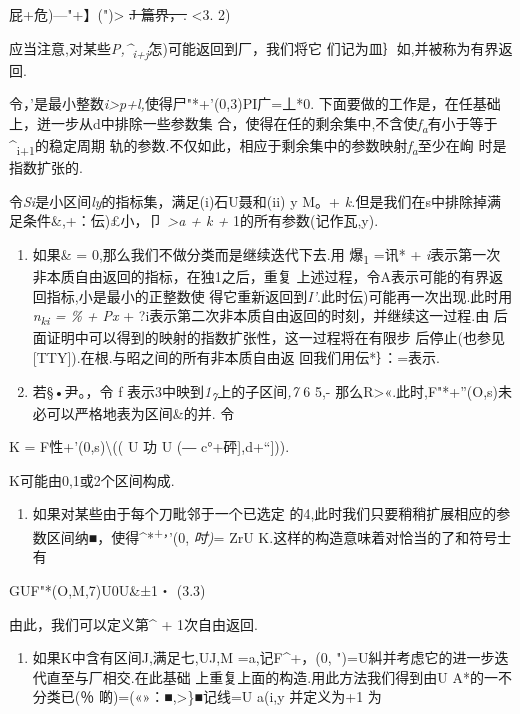 屁+危)---"+】(")\textbar{}\textgreater{} \sout{J 篇界，.} \textless{}3.
2)

应当注意,对某些\emph{P,\^{}\textsubscript{i+j}}怎)可能返回到厂，我们将它
们记为皿｝如,并被称为有界返回.

令，'是最小整数\emph{i\textgreater{}p+l,}使得尸"*+'(0,3)PI广=丄*0.
下面要做的工作是，在任基础上，迸一步从d中排除一些参数集
合，使得在任的剩余集中,不含使\emph{f\textsubscript{a}}有小于等于\^{}\textsubscript{i+1}的稳定周期
轨的参数.不仅如此，相应于剩余集中的参数映射\emph{f\textsubscript{a}}至少在峋
时是指数扩张的.

令\emph{Si}是小区间\emph{ly}的指标集，满足(i)石U聂和(ii)
\textbar{}y\textbar{} M。+
\emph{k.}但是我们在s中排除掉满足条件\&,+：伝)£小，卩\textbar{}
\emph{\textgreater{}a + k +} 1的所有参数(记作瓦,y).

\begin{enumerate}
\def\labelenumi{(\alph{enumi})}
\item
  如果\& = 0,那么我们不做分类而是继续迭代下去.用 爆\textsubscript{1}
  =讯* + \emph{i}表示第一次非本质自由返回的指标，在独1之后，重复
  上述过程，令A表示可能的有界返回指标,小是最小的正整数使
  得它重新返回到\emph{I'}.此时伝)可能再一次出现.此时用\emph{n\textsubscript{ki}
  = \% + Px} + ?i表示第二次非本质自由返回的时刻，并继续这一过程.由
  后面证明中可以得到的映射的指数扩张性，这一过程将在有限步
  后停止(也参见{[}TTY{]}).在根.与昭之间的所有非本质自由返
  回我们用伝*｝：=表示.
\item
  若§•尹。，令 f 表示3中映到\emph{1\textsubscript{7}}上的子区间\emph{,7}
  6 5,-
  那么R\textbar{}\textgreater{}«.此时,F"*+''(O,s)未必可以严格地表为区间\&的并.
  令
\end{enumerate}

K = F性+'(0,s)\textbackslash{}(( U 功 U (― c°+砰{]},d+``{]})).

K可能由0,1或2个区间构成.

\begin{enumerate}
\def\labelenumi{(\arabic{enumi})}
\item
  如果对某些由于每个刀毗邻于一个已选定
  的4,此时我们只要稍稍扩展相应的参数区间纳■，使得\^{}*\textsuperscript{+，}'(0,
  \emph{吋)}= ZrU K.这样的构造意味着对恰当的了和符号士有
\end{enumerate}

GUF"*(O,M,7)U0U\&±1・ (3.3)

由此，我们可以定义第\^{} + 1次自由返回.

\begin{enumerate}
\def\labelenumi{(\arabic{enumi})}
\setcounter{enumi}{1}
\item
  如果K中含有区间J,满足七,UJ,M\textbar{} =a,记F\^{}+，(0,
  ")=U糾并考虑它的进一步迭代直至与厂相交.在此基础
  上重复上面的构造.用此方法我们得到由U A*的一不分类已(％
  啲)=(«»：■,\textgreater{}\}■记线=U a(i,y 并定义为+1 为
\end{enumerate}

